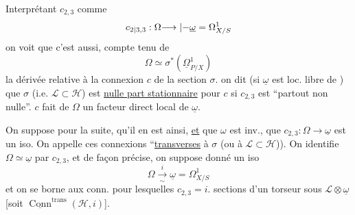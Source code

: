 Interprétant $c_{2,3}$ comme
\[
c_{{2|3},3}:\Omega{\longrightarrow|\mathbin{-}}\underline{\omega}=\Omega^1_{X/S}
\]
on voit que c'est aussi, compte tenu de
\[
\Omega\simeq\sigma^*(\underline{\Omega}^1_{P/X})
\]
la dérivée relative à la connexion $c$ de la section $\sigma$. on dit (si $\underline{\omega}$ est loc. libre de ) que $\sigma$ (i.e. $\mathcal{L}\subset\mathcal{H}$) est \uline{nulle part stationnaire} pour $c$ si $c_{2,3}$ est ``partout non nulle''.   $c$ fait de $\Omega$ un facteur direct local de $\underline{\omega}$.

On suppose pour la suite, qu'il en est ainsi, \uline{et} que $\omega$ est inv.,  que $c_{2,3}:\Omega\longrightarrow\underline{\omega}$ est un iso. On appelle ces connexions ``\uline{transverses} à $\sigma$ (ou à $\mathcal{L}\subset\mathcal{H}$)). On identifie $\Omega\simeq\underline{\omega}$ par $c_{2,3}$, et de façon précise, on suppose donné un iso
\[
\Omega\xrightarrow[\sim]{i}\underline{\omega}=\Omega^1_{X/S}
\]
et on se borne aux conn. pour lesquelles $c_{2,3}=i$.   sections d'un torseur sous $\mathcal{L}\otimes\underline{\omega}$ [soit $\underline{\operatorname{Conn}}^{\mathrm{trans}}(\mathcal{H},i)$].

